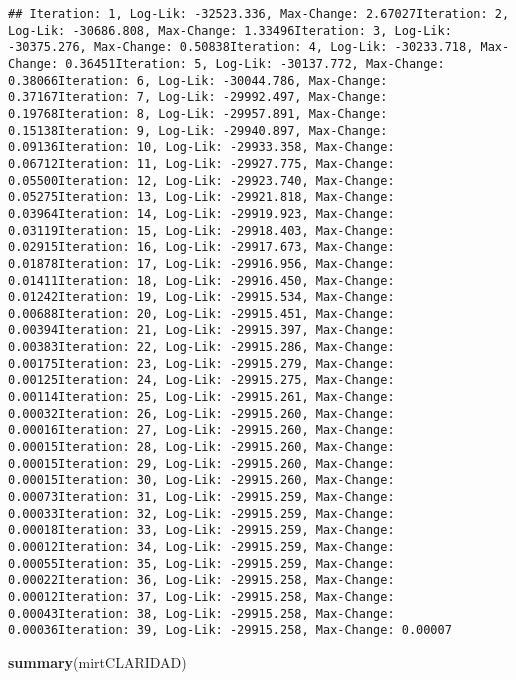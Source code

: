 \documentclass[
  10pt,
  spanish,
]{article}
\newenvironment{Shaded}{\begin{snugshade}}{\end{snugshade}}
\newcommand{\KeywordTok}[1]{\textcolor[rgb]{0.13,0.29,0.53}{\textbf{#1}}}
\newcommand{\NormalTok}[1]{#1}
\begin{document}
\begin{verbatim}
## Iteration: 1, Log-Lik: -32523.336, Max-Change: 2.67027Iteration: 2, Log-Lik: -30686.808, Max-Change: 1.33496Iteration: 3, Log-Lik: -30375.276, Max-Change: 0.50838Iteration: 4, Log-Lik: -30233.718, Max-Change: 0.36451Iteration: 5, Log-Lik: -30137.772, Max-Change: 0.38066Iteration: 6, Log-Lik: -30044.786, Max-Change: 0.37167Iteration: 7, Log-Lik: -29992.497, Max-Change: 0.19768Iteration: 8, Log-Lik: -29957.891, Max-Change: 0.15138Iteration: 9, Log-Lik: -29940.897, Max-Change: 0.09136Iteration: 10, Log-Lik: -29933.358, Max-Change: 0.06712Iteration: 11, Log-Lik: -29927.775, Max-Change: 0.05500Iteration: 12, Log-Lik: -29923.740, Max-Change: 0.05275Iteration: 13, Log-Lik: -29921.818, Max-Change: 0.03964Iteration: 14, Log-Lik: -29919.923, Max-Change: 0.03119Iteration: 15, Log-Lik: -29918.403, Max-Change: 0.02915Iteration: 16, Log-Lik: -29917.673, Max-Change: 0.01878Iteration: 17, Log-Lik: -29916.956, Max-Change: 0.01411Iteration: 18, Log-Lik: -29916.450, Max-Change: 0.01242Iteration: 19, Log-Lik: -29915.534, Max-Change: 0.00688Iteration: 20, Log-Lik: -29915.451, Max-Change: 0.00394Iteration: 21, Log-Lik: -29915.397, Max-Change: 0.00383Iteration: 22, Log-Lik: -29915.286, Max-Change: 0.00175Iteration: 23, Log-Lik: -29915.279, Max-Change: 0.00125Iteration: 24, Log-Lik: -29915.275, Max-Change: 0.00114Iteration: 25, Log-Lik: -29915.261, Max-Change: 0.00032Iteration: 26, Log-Lik: -29915.260, Max-Change: 0.00016Iteration: 27, Log-Lik: -29915.260, Max-Change: 0.00015Iteration: 28, Log-Lik: -29915.260, Max-Change: 0.00015Iteration: 29, Log-Lik: -29915.260, Max-Change: 0.00015Iteration: 30, Log-Lik: -29915.260, Max-Change: 0.00073Iteration: 31, Log-Lik: -29915.259, Max-Change: 0.00033Iteration: 32, Log-Lik: -29915.259, Max-Change: 0.00018Iteration: 33, Log-Lik: -29915.259, Max-Change: 0.00012Iteration: 34, Log-Lik: -29915.259, Max-Change: 0.00055Iteration: 35, Log-Lik: -29915.259, Max-Change: 0.00022Iteration: 36, Log-Lik: -29915.258, Max-Change: 0.00012Iteration: 37, Log-Lik: -29915.258, Max-Change: 0.00043Iteration: 38, Log-Lik: -29915.258, Max-Change: 0.00036Iteration: 39, Log-Lik: -29915.258, Max-Change: 0.00007
\end{verbatim}

\begin{Shaded}
\begin{Highlighting}[]
\KeywordTok{summary}\NormalTok{(mirtCLARIDAD)}
\end{Highlighting}
\end{Shaded}
\end{document}
